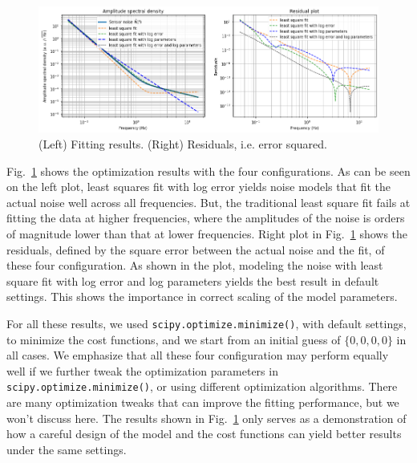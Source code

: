 \begin{figure}[!h]
	\centering
	\includegraphics[width=1\linewidth]{figures/tutorials_noise_spectrum_modeling_with_optimization_8_0}
	\caption{(Left) Fitting results. (Right) Residuals, i.e. error squared.}
	\label{fig:tutorialsnoisespectrummodelingwithoptimization80}
\end{figure}

Fig.~\ref{fig:tutorialsnoisespectrummodelingwithoptimization80} shows the optimization results with the four configurations.
As can be seen on the left plot, least squares fit with log error yields noise models that fit the actual noise well across all frequencies.
But, the traditional least square fit fails at fitting the data at higher frequencies, where the amplitudes of the noise is orders of magnitude lower than that at lower frequencies.
Right plot in Fig.~\ref{fig:tutorialsnoisespectrummodelingwithoptimization80} shows the residuals, defined by the square error between the actual noise and the fit, of these four configuration.
As shown in the plot, modeling the noise with least square fit with log error and log parameters yields the best result in default settings.
This shows the importance in correct scaling of the model parameters.

For all these results, we used \verb|scipy.optimize.minimize()|, with default settings, to minimize the cost functions, and we start from an initial guess of $\{0, 0, 0, 0\}$ in all cases.
We emphasize that all these four configuration may perform equally well if we further tweak the optimization parameters in \verb|scipy.optimize.minimize()|, or using different optimization algorithms.
There are many optimization tweaks that can improve the fitting performance, but we won't discuss here.
The results shown in Fig.~\ref{fig:tutorialsnoisespectrummodelingwithoptimization80} only serves as a demonstration of how a careful design of the model and the cost functions can yield better results under the same settings.


